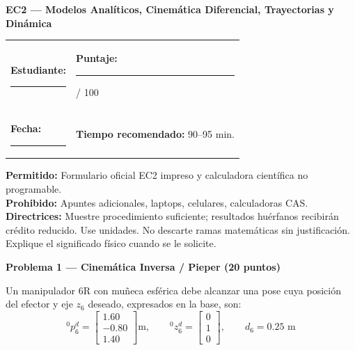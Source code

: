 \documentclass[11pt, a4paper]{article}
\begin{document}
\begin{center}
    \Large\textbf{\textcolor{ucbblue}{EC2 — Modelos Analíticos, Cinemática Diferencial, Trayectorias y Dinámica}}\\[0.2cm]
\end{center}

\begin{tabular}{ll}
\textbf{Estudiante:} \rule{8cm}{0.15mm} & \textbf{Puntaje:} \rule{2cm}{0.15mm} / 100 \\
\textbf{Fecha:} \rule{4cm}{0.15mm} & \textbf{Tiempo recomendado:} 90–95 min.
\end{tabular}

\vspace{0.3cm}
\begin{tcolorbox}[colback=gray!5, colframe=black, title=\textbf{Instrucciones y Condiciones}, left=1mm, right=1mm, top=1mm, bottom=1mm]
    \small
    \textbf{Permitido:} Formulario oficial EC2 impreso y calculadora científica no programable. \\
    \textbf{Prohibido:} Apuntes adicionales, laptops, celulares, calculadoras CAS. \\
    \textbf{Directrices:} Muestre procedimiento suficiente; resultados huérfanos recibirán crédito reducido. Use unidades. No descarte ramas matemáticas sin justificación. Explique el significado físico cuando se le solicite.
\end{tcolorbox}

\noindent\textbf{\large Problema 1 — Cinemática Inversa / Pieper (20 puntos)}

Un manipulador 6R con muñeca esférica debe alcanzar una pose cuya posición del efector y eje $z_6$ deseado, expresados en la base, son:
\begin{equation*}
    {}^0p_6^d = \begin{bmatrix} 1.60 \\ -0.80 \\ 1.40 \end{bmatrix}\text{m}, \qquad {}^0z_6^d = \begin{bmatrix} 0 \\ 1 \\ 0 \end{bmatrix}, \qquad d_6 = 0.25\text{ m}
\end{equation*}
\end{document}
